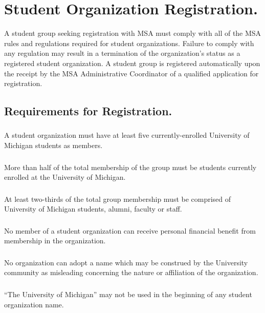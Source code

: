 
\section{Student Organization Registration.}
A student group seeking registration with MSA must comply with all of the MSA rules and regulations required for student organizations.  Failure to comply with any regulation may result in a termination of the organization's status as a registered student organization.  A student group is registered automatically upon the receipt by the MSA Administrative Coordinator of a qualified application for registration.

\subsection{Requirements for Registration.}
\subsubsection{}
A student organization must have at least five currently-enrolled University of Michigan students as members.
\subsubsection{}
More than half of the total membership of the group must be students currently enrolled at the University of Michigan.
\subsubsection{}
At least two-thirds of the total group membership must be comprised of University of Michigan students, alumni, faculty or staff.
\subsubsection{}
No member of a student organization can receive personal financial benefit from membership in the organization.
\subsubsection{}
No organization can adopt a name which may be construed by the University community as misleading concerning the nature or affiliation of the organization.
\subsubsection{}
``The University of Michigan'' may not be used in the beginning of any student organization name.
